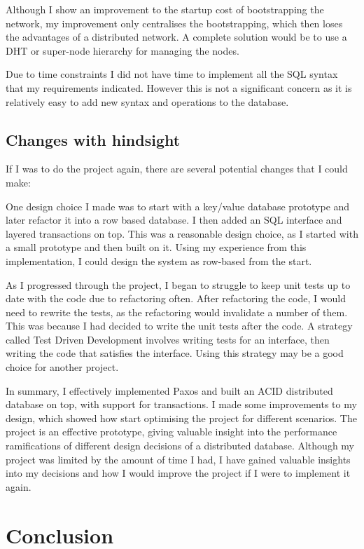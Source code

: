 \documentclass[12pt,twoside,notitlepage]{report}
\begin{document}
Although I show an improvement to the startup cost of bootstrapping the network, my improvement
only centralises the bootstrapping, which then loses the advantages of a distributed network. A
complete solution would be to use a DHT or super-node hierarchy for managing the nodes.

Due to time constraints I did not have time to implement all the SQL syntax that my requirements
indicated. However this is not a significant concern as it is relatively easy to add new syntax and
operations to the database.

\section{Changes with hindsight}

If I was to do the project again, there are several potential changes that I could make:

One design choice I made was to start with a key/value database prototype and later refactor it
into a row based database. I then added an SQL interface and layered transactions on top. This was
a reasonable design choice, as I started with a small prototype and then built on it.  Using my
experience from this implementation, I could design the system as row-based from the start.

As I progressed through the project, I began to struggle to keep unit tests up to date with the
code due to refactoring often. After refactoring the code, I would need to rewrite the tests, as
the refactoring would invalidate a number of them. This was because I had decided to write the
unit tests after the code.  A strategy called Test Driven Development involves writing tests for
an interface, then writing the code that satisfies the interface. Using this strategy may be a
good choice for another project.

In summary, I effectively implemented Paxos and built an ACID distributed database on top, with
support for transactions. I made some improvements to my design, which showed how start optimising
the project for different scenarios. The project is an effective prototype, giving valuable
insight into the performance ramifications of different design decisions of a distributed
database. Although my project was limited by the amount of time I had, I have gained valuable
insights into my decisions and how I would improve the project if I were to implement it again.

\cleardoublepage
\chapter{Conclusion}
\end{document}
